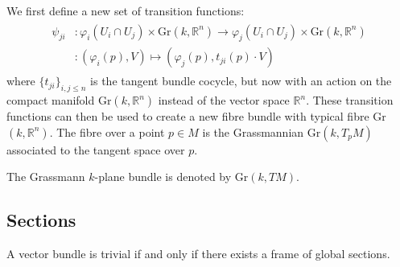    \begin{construct}\label{manifolds:grassmann_bundle}
        We first define a new set of transition functions:
        \begin{gather}
            \begin{aligned}
                \psi_{ji}&:\varphi_i(U_i\cap U_j)\times \text{Gr}(k, \mathbb{R}^n) \rightarrow \varphi_j(U_i\cap U_j)\times \text{Gr}(k, \mathbb{R}^n)\\
                &:(\varphi_i(p), V)\mapsto(\varphi_j(p), t_{ji}(p)\cdot V)
            \end{aligned}
        \end{gather}
        where $\{t_{ji}\}_{i, j\leq n}$ is the tangent bundle cocycle, but now with an action on the compact manifold Gr$(k, \mathbb{R}^n)$ instead of the vector space $\mathbb{R}^n$. These transition functions can then be used to create a new fibre bundle with typical fibre Gr$(k, \mathbb{R}^n)$. The fibre over a point $p\in M$ is the Grassmannian Gr$(k, T_pM)$ associated to the tangent space over $p$.
    \end{construct}
    \begin{notation}
        The Grassmann $k$-plane bundle is denoted by Gr$(k, TM)$.
    \end{notation}


\subsection{Sections}

    \begin{property}\label{diff:prop:trivial_vector_bundle}
        A vector bundle is trivial if and only if there exists a frame of global sections.
    \end{property}

